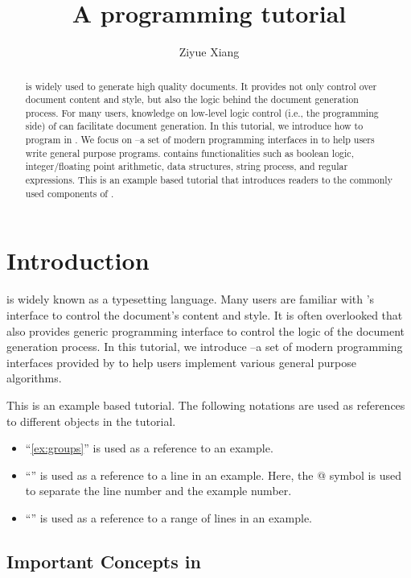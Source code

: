 \documentclass{ltugboat}
\title{A \LTT{} programming tutorial}
\author{Ziyue Xiang}
\begin{document}
\begin{abstract}
\LT{} is widely used to generate high quality documents.
It provides not only control over document content and style, but also the logic behind the document generation process.
For many users, knowledge on low-level logic control (i.e., the programming side) of \LT{} can facilitate document generation.
In this tutorial, we introduce how to program in \LT{}.
We focus on \LTT{}--a set of modern programming interfaces in \LT{} to help users write general purpose programs.
\LTT{} contains functionalities such as boolean logic, integer/floating point arithmetic, data structures, string process, and regular expressions.
This is an example based \LTT{} tutorial that introduces readers to the commonly used components of \LTT{}.
\end{abstract}

\maketitle

\tableofcontents
\ListOfCodeExample


\section{Introduction}

\LT{} is widely known as a typesetting language.
Many \LT{} users are familiar with \LT{}'s interface to control the document's content and style.
It is often overlooked that \LT{} also provides generic programming interface to control the logic of the document generation process.
In this tutorial, we introduce \LTT{}--a set of modern programming interfaces provided by \LT{} to help users implement various general purpose algorithms.

This is an example based tutorial. 
The following notations are used as references to different objects in the tutorial.
\begin{itemize}
  \item ``\cref{ex:groups}'' is used as a reference to an example.
  \item ``'' is used as a reference to a line in an example. Here, the @ symbol is used to separate the line number and the example number.
  \item ``'' is used as a reference to a range of lines in an example.
\end{itemize}

\subsection{Important Concepts in \LT{}}\label{sec:important-concepts}
\end{document}
